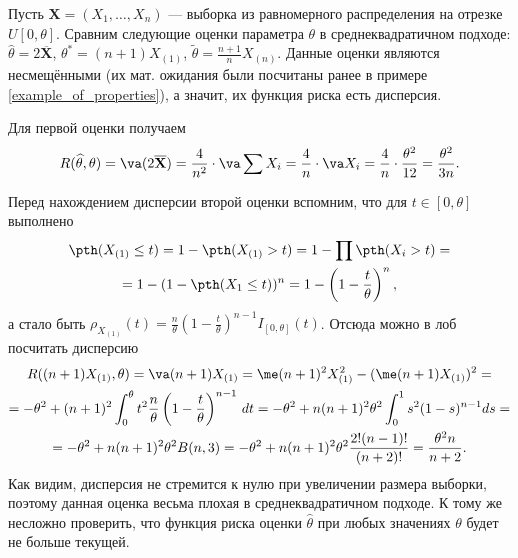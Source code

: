 \begin{example}
    Пусть $\mathbf X = (X_1, \ldots, X_n)$ --- выборка из равномерного распределения на отрезке $U[0, \theta]$. Сравним следующие оценки параметра $\theta$ в среднеквадратичном подходе: $\widehat{\theta} = 2\overline{\mathbf X}$, $\theta^* = (n + 1)X_{(1)}$, $\widetilde{\theta} = \frac{n+1}{n}X_{(n)}$. Данные оценки являются несмещёнными (их мат. ожидания были посчитаны ранее в примере \ref{example_of_properties}), а значит, их функция риска есть дисперсия.
    
    Для первой оценки получаем
    \[
    R(\widehat{\theta}, \theta) = \va (2\overline{\mathbf X}) = \frac{4}{n^2}\cdot\va \sum X_i = \frac{4}{n}\cdot\va X_i = \frac{4}{n}\cdot \frac{\theta^2}{12} = \frac{\theta^2}{3n}.
    \]
    
    Перед нахождением дисперсии второй оценки вспомним, что для $t \in [0, \theta]$ выполнено
    \begin{gather*}
    	\pth(X_{(1)} \le t) = 1 - \pth(X_{(1)} > t) = 1 - \prod \pth(X_i > t) = \\
    	= 1 - (1 - \pth(X_1 \le t))^n = 1 - \left(1 - \frac{t}{\theta}\right)^n,
    \end{gather*}
    а стало быть $\rho_{X_{(1)}}(t) = \frac{n}{\theta}\left(1 - \frac{t}{\theta}\right)^{n - 1}I_{[0, \theta]}(t)$. Отсюда можно в лоб посчитать дисперсию
    \begin{gather*}
    R((n+1)X_{(1)}, \theta) = \va (n+1)X_{(1)} = \me (n+1)^2X_{(1)}^2 - (\me (n+1)X_{(1)})^2 =\\
    = -\theta^2 + (n+1)^2\int_0^{\theta} t^2\frac{n}{\theta}\left(1 - \frac{t}{\theta}\right)^{n - 1}\,dt = -\theta^2 + n(n+1)^2 \theta^2 \int_0^1 s^2(1-s)^{n-1} ds =\\
    = -\theta^2 + n(n+1)^2 \theta^2 B(n, 3) = -\theta^2 + n(n+1)^2 \theta^2 \frac{2!(n-1)!}{(n+2)!} = \frac{\theta^2n}{n+2}.
    \end{gather*}
    Как видим, дисперсия не стремится к нулю при увеличении размера выборки, поэтому данная оценка весьма плохая в среднеквадратичном подходе. К тому же несложно проверить, что функция риска оценки $\widehat{\theta}$ при любых значениях $\theta$ будет не больше текущей.
    

\end{example}
